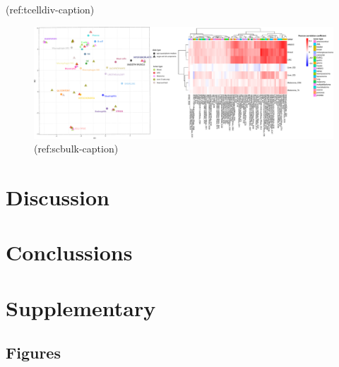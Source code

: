 \documentclass[12pt,]{book}
\theoremstyle{definition}
\theoremstyle{definition}
\theoremstyle{definition}
\theoremstyle{remark}
\begin{document}
(ref:tcelldiv-caption)

\begin{figure}

{\centering \includegraphics[width=7.5in,angle=90]{figures-ext/corr_sc_tcell_plot} 

}

\caption[Metagenes from single cell and bulk transcriptome]{(ref:scbulk-caption)}\label{fig:scbulk}
\end{figure}

\hypertarget{discussion}{%
\section{Discussion}\label{discussion}}

\hypertarget{conclussions}{%
\section{Conclussions}\label{conclussions}}

\newpage

\hypertarget{supplementary}{%
\section{Supplementary}\label{supplementary}}

\hypertarget{figures}{%
\subsection{Figures}\label{figures}}
\end{document}
